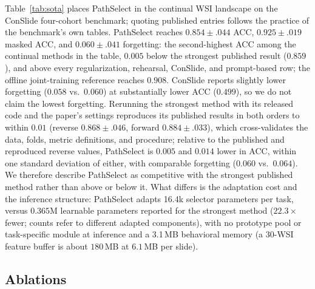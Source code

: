 \documentclass{article}
\begin{document}
Table~\ref{tab:sota} places PathSelect in the continual WSI landscape on the ConSlide four-cohort benchmark; quoting published entries follows the practice of the benchmark's own tables. PathSelect reaches $0.854{\pm}.044$ ACC, $0.925{\pm}.019$ masked ACC, and $0.060{\pm}.041$ forgetting: the second-highest ACC among the continual methods in the table, $0.005$ below the strongest published result ($0.859$), and above every regularization, rehearsal, ConSlide, and prompt-based row; the offline joint-training reference reaches $0.908$. ConSlide reports slightly lower forgetting ($0.058$ vs.\ $0.060$) at substantially lower ACC ($0.499$), so we do not claim the lowest forgetting. Rerunning the strongest method with its released code and the paper's settings reproduces its published results in both orders to within $0.01$ (reverse $0.868{\pm}.046$, forward $0.884{\pm}.033$), which cross-validates the data, folds, metric definitions, and procedure; relative to the published and reproduced reverse values, PathSelect is $0.005$ and $0.014$ lower in ACC, within one standard deviation of either, with comparable forgetting ($0.060$ vs.\ $0.064$). We therefore describe PathSelect as competitive with the strongest published method rather than above or below it. What differs is the adaptation cost and the inference structure: PathSelect adapts 16.4k selector parameters per task, versus $0.365$M learnable parameters reported for the strongest method ($22.3\times$ fewer; counts refer to different adapted components), with no prototype pool or task-specific module at inference and a 3.1\,MB behavioral memory (a 30-WSI feature buffer is about $180$\,MB at $6.1$\,MB per slide).

\subsection{Ablations}
\label{ssec:ablation}
\end{document}

